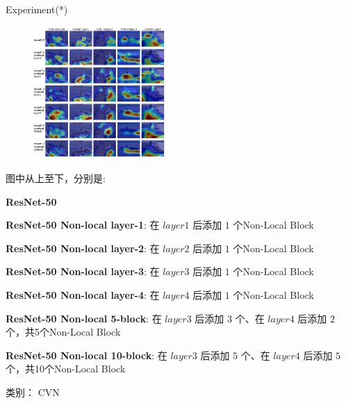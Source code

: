 \begin{frame}{Experiment(*)}
    \begin{multicols}{2}
    \begin{figure}
        \centering
        \includegraphics[width=0.45\textwidth]{docs/paperReading/Non-local/exp/CVN.png}
    \end{figure}

    \begin{scriptsize}
        图中从上至下，分别是:

        \begin{tiny}
            \textbf{ResNet-50}

            \textbf{ResNet-50 Non-local layer-1}: 在 $layer1$ 后添加 $1$ 个Non-Local Block

            \textbf{ResNet-50 Non-local layer-2}: 在 $layer2$ 后添加 $1$ 个Non-Local Block

            \textbf{ResNet-50 Non-local layer-3}: 在 $layer3$ 后添加 $1$ 个Non-Local Block
            
            \textbf{ResNet-50 Non-local layer-4}: 在 $layer4$ 后添加 $1$ 个Non-Local Block
            
            \textbf{ResNet-50 Non-local 5-block}: 在 $layer3$ 后添加 $3$ 个、在 $layer4$ 后添加 $2$ 个，共5个Non-Local Block
            
            \textbf{ResNet-50 Non-local 10-block}: 在 $layer3$ 后添加 $5$ 个、在 $layer4$ 后添加 $5$ 个，共10个Non-Local Block
        \end{tiny}

        类别： CVN 
    \end{scriptsize}
\end{multicols}
\end{frame}


